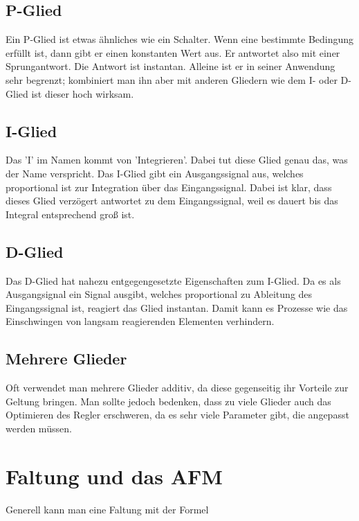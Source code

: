 \subsection*{P-Glied}

Ein P-Glied ist etwas ähnliches wie ein Schalter. Wenn eine bestimmte Bedingung erfüllt ist, dann gibt er einen konstanten Wert aus. Er antwortet also mit einer 
Sprungantwort. Die Antwort ist instantan. Alleine ist er in seiner Anwendung sehr begrenzt; kombiniert man ihn aber mit anderen Gliedern wie dem I- oder D-Glied ist dieser hoch wirksam.

\subsection*{I-Glied}

Das 'I' im Namen kommt von 'Integrieren'. Dabei tut diese Glied genau das, was der Name verspricht. Das I-Glied gibt ein Ausgangssignal aus, welches 
proportional ist zur Integration über das Eingangssignal. Dabei ist klar, dass dieses Glied verzögert antwortet zu dem Eingangssignal, weil 
es dauert bis das Integral entsprechend groß ist.

\subsection*{D-Glied}

Das D-Glied hat nahezu entgegengesetzte Eigenschaften zum I-Glied. Da es als Ausgangsignal ein Signal ausgibt, welches proportional zu Ableitung des 
Eingangssignal ist, reagiert das Glied instantan. Damit kann es Prozesse wie das Einschwingen von langsam reagierenden Elementen verhindern.

\subsection*{Mehrere Glieder}

Oft verwendet man mehrere Glieder additiv, da diese gegenseitig ihr Vorteile zur Geltung bringen. Man sollte jedoch bedenken, dass zu viele Glieder auch das 
Optimieren des Regler erschweren, da es sehr viele Parameter gibt, die angepasst werden müssen.


\section{Faltung und das AFM}

Generell kann man eine Faltung mit der Formel 

